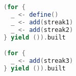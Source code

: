 \begin{lstlisting}[label=code:roundmonad, language=Scala, caption=Esempio di dichiarazione di un \texttt{Round} mediante sintassi monadica.]
(for {
  _ <- define()
  _ <- add(streak1)
  _ <- add(streak2)
} yield ()).built

(for {
  _ <- add(streak3)
} yield ()).built
\end{lstlisting}